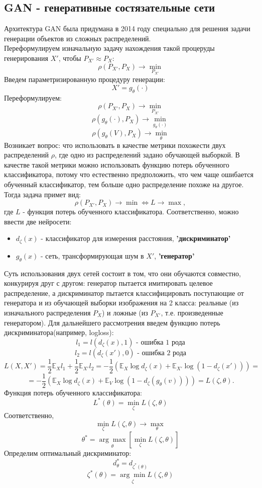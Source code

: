 \documentclass[a4paper]{article}
\begin{document}
		\subsection{GAN - генеративные состязательные сети}
			Архитектура GAN была придумана в 2014 году специально для решения задачи генерации объектов из сложных распределений. \\
			Переформулируем изначальную задачу нахождения такой процеруды генерирования $X'$, чтобы $ P_{X'} \approx P_X$:
			$$ \rho(P_{X'}, P_X) \longrightarrow \underset{P_{X'}}{\min} $$
			Введем параметризированную процедуру генерации:
			$$ X' = g_{\theta}(\cdot) $$
			Переформулируем:
			$$ \rho(P_{X'}, P_X) \longrightarrow \underset{P_{X'}}{\min} $$
			$$ \rho(g_{\theta}(\cdot), P_X) \longrightarrow \underset{g_{\theta}(\cdot)}{\min} $$
			$$ \rho(g_{\theta}(V), P_X) \longrightarrow \underset{\theta}{\min} $$
			Возникает вопрос: что использовать в качестве метрики похожести двух распределений $\rho$, где одно из распределений задано обучающей выборкой.
			В качестве такой метрики можно использовать функцию потерь обученного классификатора, потому что естественно предположить, что чем чаще ошибается обученный классификатор, тем больше одно распределение похоже на другое. Тогда задача примет вид:
			$$ \rho(P_{X'}, P_X) \longrightarrow \min \Leftrightarrow L \longrightarrow \max, $$
			где $L$ - функция потерь обученного классификатора.
			Соответственно, можно ввести две нейросети:
			\begin{itemize}
				\item $d_{\zeta}(x)$ - классификатор для измерения расстояния, \textbf{'дискриминатор'}
				\item $g_{\theta}(x)$ - сеть, трансформирующая шум в $X'$, \textbf{'генератор'}
			\end{itemize}
			Суть использования двух сетей состоит в том, что они обучаются совместно, конкурируя друг с другом: генератор пытается имитировать целевое распределение, а дискриминатор пытается классифицировать поступающие от генератора и из обучающей выборки изображения на 2 класса: реальные (из изначального распределения $P_X$) и ложные (из $P_{X'}$, т.е. произведенные генератором).
			Для дальнейшего рассмотрения введем функцию потерь дискриминатора(например, logloss):
			$$ l_1 = l(d_{\zeta}(x), 1) \text{ - ошибка 1 рода} $$
			$$ l_2 = l(d_{\zeta}(x'), 0) \text{ - ошибка 2 рода}$$
			$$ L(X, X') = \frac{1}{2} \mathbb{E}_{X} l_1 + \frac{1}{2} \mathbb{E}_{X'} l_2 = -\frac{1}{2} (\mathbb{E}_{X} \log d_{\zeta}(x) + \mathbb{E}_{X'} \log (1 - d_{\zeta}(x'))) = $$
			$$ =  -\frac{1}{2} (\mathbb{E}_{X} \log d_{\zeta}(x) + \mathbb{E}_{V} \log (1 - d_{\zeta}(g_{\theta}(v)))) = L(\zeta, \theta) .$$
			Функция потерь обученного классификатора:
			$$ L^*(\theta) = \underset{\zeta}{\min} L(\zeta, \theta) $$
			Соответственно,
			$$ \underset{\zeta}{\min} L(\zeta, \theta) \longrightarrow \underset{\theta}{\max} $$
			$$ \theta^* = \underset{\theta}{\arg\max} \left[ \underset{\zeta}{\min} L(\zeta, \theta) \right] $$
			Определим оптимальный дискриминатор:
			$$ d^*_{\theta} = d_{\zeta^*(\theta)} $$
			$$ \zeta^*(\theta) =  \underset{\zeta}{\arg\min} L(\zeta, \theta)$$
\end{document}
